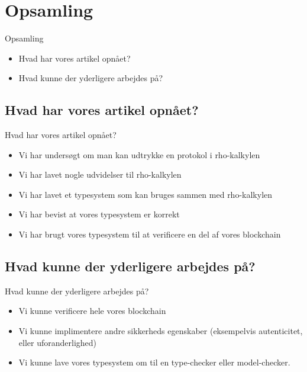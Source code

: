 \section{Opsamling}
\begin{frame}{Opsamling}
  \begin{itemize}
    \item Hvad har vores artikel opnået?
    \item Hvad kunne der yderligere arbejdes på?
  \end{itemize}
\end{frame}

\subsection{Hvad har vores artikel opnået?}
\begin{frame}{Hvad har vores artikel opnået?}
  \begin{itemize}
    \item Vi har undersøgt om man kan udtrykke en protokol i rho-kalkylen
    \item Vi har lavet nogle udvidelser til rho-kalkylen
    \item Vi har lavet et typesystem som kan bruges sammen med rho-kalkylen
    \item Vi har bevist at vores typesystem er korrekt
    \item Vi har brugt vores typesystem til at verificere en del af vores blockchain
  \end{itemize}
\end{frame}


\subsection{Hvad kunne der yderligere arbejdes på?}
\begin{frame}{Hvad kunne der yderligere arbejdes på?}
  \begin{itemize}
    \item  Vi kunne verificere hele vores blockchain
    \item Vi kunne implimentere andre sikkerheds egenskaber (eksempelvis autenticitet, eller uforanderlighed)
    \item Vi kunne lave vores typesystem om til en type-checker eller model-checker.
  \end{itemize}
\end{frame}
